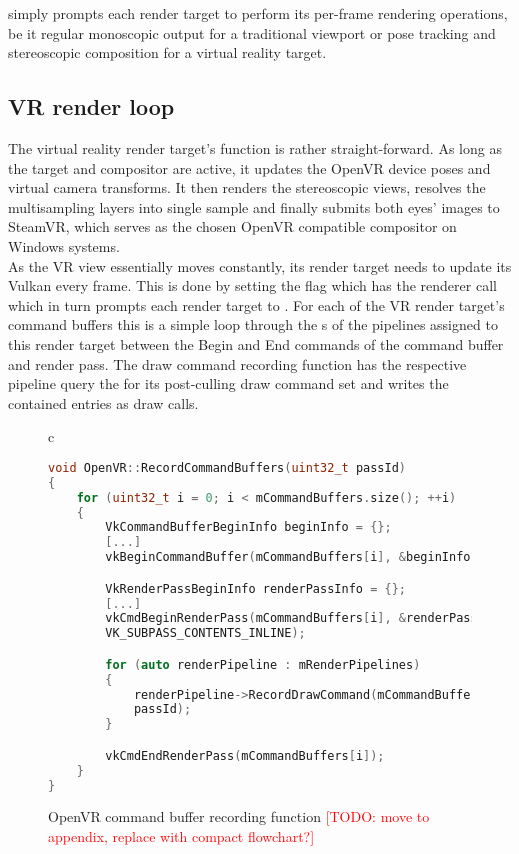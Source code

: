  simply prompts each render target to perform its per-frame rendering operations, be it regular monoscopic output for a traditional viewport or pose tracking and stereoscopic composition for a virtual reality target. 

\subsection{VR render loop}
The virtual reality render target's  function is rather straight-forward. 
As long as the target and compositor are active, it updates the OpenVR device poses and virtual camera transforms. It then renders the stereoscopic views, resolves the multisampling layers into single sample and finally submits both eyes' images to SteamVR, which serves as the chosen OpenVR compatible compositor on Windows systems. \\

As the VR view essentially moves constantly, its render target needs to update its Vulkan  every frame. This is done by setting the  flag which has the renderer call  which in turn prompts each render target to . For each of the VR render target's command buffers this is a simple loop through the s of the pipelines assigned to this render target between the Begin and End commands of the command buffer and render pass. The draw command recording function has the respective pipeline query the  for its post-culling draw command set and writes the contained entries as  draw calls. 

\begin{figure}[htb]
  \centering
  \begin{tabular}{c}
  \begin{lstlisting}[language=C++]
void OpenVR::RecordCommandBuffers(uint32_t passId)
{
	for (uint32_t i = 0; i < mCommandBuffers.size(); ++i)
	{
		VkCommandBufferBeginInfo beginInfo = {};
		[...]
		vkBeginCommandBuffer(mCommandBuffers[i], &beginInfo);

		VkRenderPassBeginInfo renderPassInfo = {};
		[...]
		vkCmdBeginRenderPass(mCommandBuffers[i], &renderPassInfo, 
		VK_SUBPASS_CONTENTS_INLINE);

		for (auto renderPipeline : mRenderPipelines)
		{
			renderPipeline->RecordDrawCommand(mCommandBuffers[i], 
			passId);
		}

		vkCmdEndRenderPass(mCommandBuffers[i]);
	}
}
	\end{lstlisting}
  \end{tabular}
  \caption[OpenVR render target's RecordCommandBuffers]{OpenVR command buffer recording function \textcolor{red}{[TODO: move to appendix, replace with compact flowchart?]}}\label{fig:lst_OpenVR_RecordCommandBuffers}
\end{figure}

